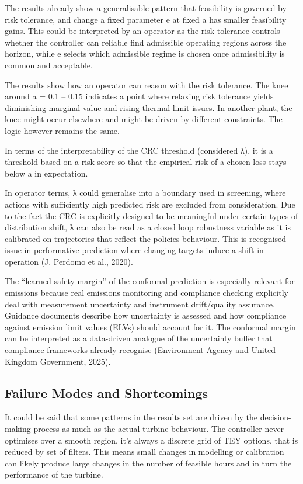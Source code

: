 \documentclass[11pt]{article}
\begin{document}
The results already show a generalisable pattern that feasibility is
governed by risk tolerance, and change a fixed parameter e at fixed a
has smaller feasibility gains. This could be interpreted by an operator
as the risk tolerance controls whether the controller can reliable find
admissible operating regions across the horizon, while e selects which
admissible regime is chosen once admissibility is common and acceptable.

The results show how an operator can reason with the risk tolerance. The
knee around a = 0.1 -- 0.15 indicates a point where relaxing risk
tolerance yields diminishing marginal value and rising thermal-limit
issues. In another plant, the knee might occur elsewhere and might be
driven by different constraints. The logic however remains the same.

In terms of the interpretability of the CRC threshold (considered λ), it
is a threshold based on a risk score so that the empirical risk of a
chosen loss stays below a in expectation.

In operator terms, λ could generalise into a boundary used in screening,
where actions with sufficiently high predicted risk are excluded from
consideration. Due to the fact the CRC is explicitly designed to be
meaningful under certain types of distribution shift, λ can also be read
as a closed loop robustness variable as it is calibrated on trajectories
that reflect the policies behaviour. This is recognised issue in
performative prediction where changing targets induce a shift in
operation (J. Perdomo et al., 2020).

The ``learned safety margin'' of the conformal prediction is especially
relevant for emissions because real emissions monitoring and compliance
checking explicitly deal with measurement uncertainty and instrument
drift/quality assurance. Guidance documents describe how uncertainty is
assessed and how compliance against emission limit values (ELVs) should
account for it. The conformal margin can be interpreted as a data-driven
analogue of the uncertainty buffer that compliance frameworks already
recognise (Environment Agency and United Kingdom Government, 2025).

\subsection{\texorpdfstring{Failure Modes and Shortcomings
}{Failure Modes and Shortcomings }}\label{failure-modes-and-shortcomings}

It could be said that some patterns in the results set are driven by the
decision-making process as much as the actual turbine behaviour. The
controller never optimises over a smooth region, it's always a discrete
grid of TEY options, that is reduced by set of filters. This means small
changes in modelling or calibration can likely produce large changes in
the number of feasible hours and in turn the performance of the turbine.
\end{document}
